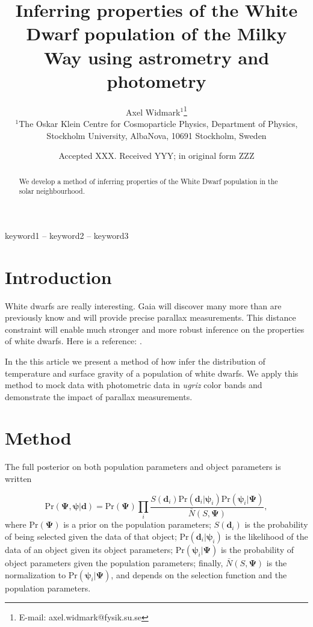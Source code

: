 \documentclass[fleqn,usenatbib]{mnras}
\title[Inferring properties of the White Dwarf population]{Inferring properties of the White Dwarf population of the Milky Way using astrometry and photometry}
\author[A. Widmark]{
Axel Widmark$^1$\thanks{E-mail: axel.widmark@fysik.su.se} 
\\
$^1$The Oskar Klein Centre for Cosmoparticle Physics, Department of
Physics, Stockholm University, AlbaNova, 10691 Stockholm, Sweden\\
}
\date{Accepted XXX. Received YYY; in original form ZZZ}
\newcommand{\popp}{\boldsymbol{\Psi}}
\newcommand{\objp}{\boldsymbol{\psi}}
\newcommand{\data}{\mathbf{d}}
\newcommand{\pr}{\text{Pr}}
\begin{document}
\label{firstpage}
\pagerange{\pageref{firstpage}--\pageref{lastpage}}
\maketitle

\begin{abstract}
We develop a method of inferring properties of the White Dwarf population in the solar neighbourhood.
\end{abstract}

\begin{keywords}
keyword1 -- keyword2 -- keyword3
\end{keywords}









\section{Introduction}

White dwarfs are really interesting. Gaia will discover many more than are previously know and will provide precise parallax measurements. This distance constraint will enable much stronger and more robust inference on the properties of white dwarfs. Here is a reference: \cite{Mortlock:2008gf}.

In the this article we present a method of how infer the distribution of temperature and surface gravity of a population of white dwarfs. We apply this method to mock data with photometric data in \emph{ugriz} color bands and demonstrate the impact of parallax measurements.








\section{Method}\label{sec:method}

The full posterior on both population parameters and object parameters is written

\begin{equation}\label{eq:fullposterior}
	\pr(\popp,\objp | \data ) = \pr(\popp)
    \prod_i \frac{S(\data_i) \pr(\data_i|\objp_i) \pr(\objp_i | \popp)}{\bar{N}(S,\popp)},
\end{equation}
where $\pr(\popp)$ is a prior on the population parameters; $S(\data_i)$ is the probability of being selected given the data of that object; $\pr(\data_i|\objp_i)$ is the likelihood of the data of an object given its object parameters; $\pr(\objp_i | \popp)$ is the probability of object parameters given the population parameters; finally, $\bar{N}(S,\popp)$ is the normalization to $\pr(\objp_i | \popp)$, and depends on the selection function and the population parameters.
\end{document}
